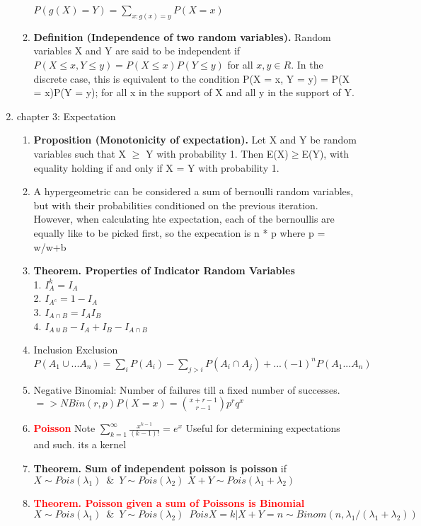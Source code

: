 \documentclass[11pt]{article}
\begin{document}
\begin{enumerate}
\begin{enumerate}
	$P(g(X) = Y) = \sum_{x:g(x)=y} P(X=x)$
	\item \textbf{Definition (Independence of two random variables).} Random variables X and Y are said to be independent
	if
	$P(X \le x, Y \le y) = P(X \le x)P(Y \le y)$
	for all $x, y \in R$. In the discrete case, this is equivalent to the condition
	P(X = x, Y = y) = P(X = x)P(Y = y);
	for all x in the support of X and all y in the support of Y.
\end{enumerate}
\item chapter 3: Expectation
\begin{enumerate}
	\item\textbf{ Proposition (Monotonicity of expectation).} Let X and Y be random variables such that X $\ge$ Y with probability 1. Then E(X)$\ge$E(Y), with equality holding if and only if X = Y with probability 1. 
	\item A hypergeometric can be considered a sum of bernoulli random variables, but with their probabilities conditioned on the previous iteration. However, when calculating hte expectation, each of the bernoullis are equally like to be picked first, so the expecation is n * p where p = w/w+b
	\item \textbf{Theorem. Properties of Indicator Random Variables}\\
	1. $I_A^k=I_A$\\
	2. $I_{A^c} = 1 - I_A$\\
	3. $I_{A\cap B} = I_AI_B$\\
	4. $I_{A\Cup B} - I_A + I_B - I_{A\cap B}$
	\item Inclusion Exclusion \\
	$P(A_1\cup ... A_n) = \sum_iP(A_i)-\sum_{j>i}P(A_i\cap A_j) + ... (-1)^nP(A_1...A_n)$
	\item Negative Binomial: Number of failures till a fixed number of successes. $=> NBin(r,p)P(X=x) = \binom{x+r-1}{r-1}p^rq^{x}$
	\item \textcolor{red}{\textbf{Poisson}} Note $\sum_{k=1}^{\infty}\frac{x^{k-1}}{(k-1)!} = e^x$ Useful for determining expectations and such. its a kernel
	\item \textbf{Theorem. Sum of independent poisson is poisson} if $X\sim Pois(\lambda_1) \, \, \, \& \, \, \, Y \sim Pois(\lambda_2) \, \, X+Y \sim Pois(\lambda_1+\lambda_2)$
	\item \textcolor{red}{\textbf{Theorem. Poisson given a sum of Poissons is Binomial}} $X\sim Pois(\lambda_1) \, \, \, \& \, \, \, Y \sim Pois(\lambda_2) \, \, \, PoisX=k|X+Y=n \sim Binom(n,\lambda_1/(\lambda_1+\lambda_2))$

\end{enumerate}
\end{enumerate}
\end{document}
